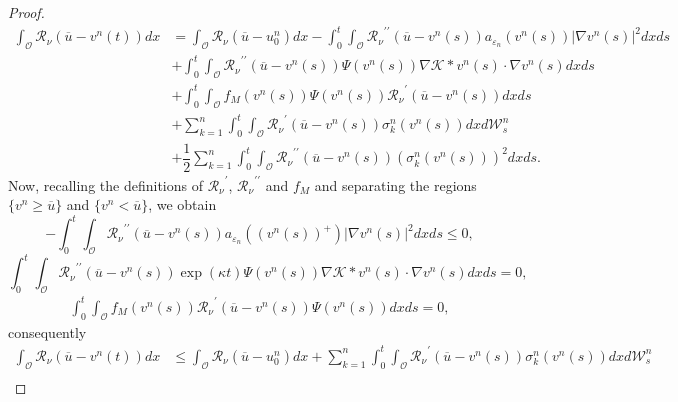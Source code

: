 \documentclass[10pt,number,preprint,times]{elsarticle}
\numberwithin{equation}{section} %
\begin{document}
\begin{proof}
\begin{align}\label{itorégv}
	\int_\mathcal{O} \mathcal{R}_{\nu}\left(\overline{u}-v^n(t)\right) dx&=\int_\mathcal{O} \mathcal{R}_{\nu}\left(\overline{u}-u_0^n\right) dx \nonumber-\int_0^t \int_\mathcal{O} {\mathcal{R}_\nu}^{\prime \prime}(\overline{u}-v^n(s)) a_{\varepsilon_n}(v^n(s)) \vert \nabla v^n(s) \vert^2 dx ds \nonumber\\
	&+\int_0^t \int_\mathcal{O} {\mathcal{R}_\nu}^{\prime \prime}(\overline{u}-v^n(s))\Psi(v^n(s))\nabla \mathcal{K} \ast v^n(s) \cdot \nabla v^n(s)dxds \nonumber\\
	&+\int_0^t \int_{\mathcal{O}} f_M(v^n(s)) \Psi(v^n(s)) {\mathcal{R}_\nu}^{\prime}(\overline{u}-v^n(s))dx ds\nonumber\\
	&+\sum_{k=1}^{n} \int_{0}^t \int_{\mathcal{O}} {\mathcal{R}_\nu}^{\prime}(\overline{u}-v^n(s)) \sigma_{k}^n(v^n(s)) dx d\mathcal{W}^n_s\nonumber \\
	&+\dfrac{1}{2} \sum_{k=1}^{n} \int_{0}^{t} \int_{\mathcal{O}} {\mathcal{R}_\nu}^{\prime \prime}(\overline{u}-v^n(s))  \left(\sigma_{k}^n( v^n(s))\right)^2 dx ds.
\end{align}
Now, recalling the definitions of ${\mathcal{R}_\nu}^{\prime}$, ${\mathcal{R}_\nu}^{\prime \prime}$ and $f_M$ and separating the regions $\{v^n \geq \overline{u}\}$ and $\{v^n<\overline{u}\}$, we obtain 
$$-\int_0^t \int_\mathcal{O} {\mathcal{R}_\nu}^{\prime \prime}(\overline{u}-v^n(s)) a_{\varepsilon_n}(\left(v^n(s)\right)^+) \vert \nabla v^n(s) \vert^2 dx ds\leq  0,$$
$$\int_0^t \int_\mathcal{O} {\mathcal{R}_\nu}^{\prime \prime}(\overline{u}-v^n(s))\exp(\kappa t)\Psi(v^n(s))\nabla \mathcal{K} \ast v^n(s) \cdot \nabla v^n(s)dxds=0,$$
\begin{align*}
\int_0^t \int_{\mathcal{O}} f_M(v^n(s)) {\mathcal{R}_\nu}^{\prime}(\overline{u}-v^n(s)) \Psi(v^n(s))dx ds=0,
\end{align*}
consequently
\begin{align}\label{applyéxp}
	\int_\mathcal{O} \mathcal{R}_{\nu}\left(\overline{u}-v^n(t)\right) dx&\leq \int_\mathcal{O} \mathcal{R}_{\nu}\left(\overline{u}-u^n_0\right) dx+\sum_{k=1}^{n} \int_{0}^t \int_{\mathcal{O}} {\mathcal{R}_\nu}^{\prime}(\overline{u}-v^n(s)) \sigma_{k}^n(v^n(s)) dx d\mathcal{W}^n_s\nonumber \\

\end{align}
\end{proof}
\end{document}
